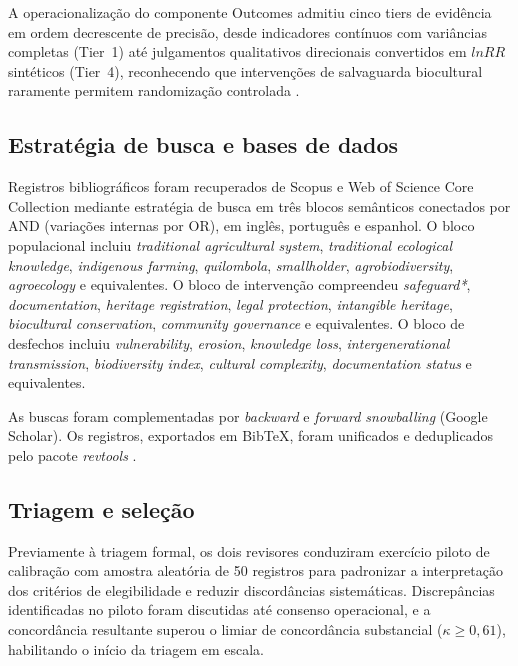 \documentclass[12pt,a4paper]{article}
\begin{document}
A operacionalização do componente Outcomes admitiu cinco tiers de evidência em ordem decrescente de precisão, desde indicadores contínuos com variâncias completas (Tier~1) até julgamentos qualitativos direcionais convertidos em $lnRR$ sintéticos (Tier~4), reconhecendo que intervenções de salvaguarda biocultural raramente permitem randomização controlada \citep{Shadish2002}.

\subsection{Estratégia de busca e bases de dados}
\label{sec:search}

Registros bibliográficos foram recuperados de Scopus e Web of Science Core Collection mediante estratégia de busca em três blocos semânticos conectados por AND (variações internas por OR), em inglês, português e espanhol. O bloco populacional incluiu \textit{traditional agricultural system}, \textit{traditional ecological knowledge}, \textit{indigenous farming}, \textit{quilombola}, \textit{smallholder}, \textit{agrobiodiversity}, \textit{agroecology} e equivalentes. O bloco de intervenção compreendeu \textit{safeguard*}, \textit{documentation}, \textit{heritage registration}, \textit{legal protection}, \textit{intangible heritage}, \textit{biocultural conservation}, \textit{community governance} e equivalentes. O bloco de desfechos incluiu \textit{vulnerability}, \textit{erosion}, \textit{knowledge loss}, \textit{intergenerational transmission}, \textit{biodiversity index}, \textit{cultural complexity}, \textit{documentation status} e equivalentes.

As buscas foram complementadas por \textit{backward} e \textit{forward snowballing} (Google Scholar). Os registros, exportados em BibTeX, foram unificados e deduplicados pelo pacote \textit{revtools} \citep{Westgate2019}.

\subsection{Triagem e seleção}
\label{sec:screening}

Previamente à triagem formal, os dois revisores conduziram exercício piloto de calibração com amostra aleatória de 50 registros para padronizar a interpretação dos critérios de elegibilidade e reduzir discordâncias sistemáticas. Discrepâncias identificadas no piloto foram discutidas até consenso operacional, e a concordância resultante superou o limiar de concordância substancial ($\kappa \geq 0{,}61$), habilitando o início da triagem em escala.
\end{document}
